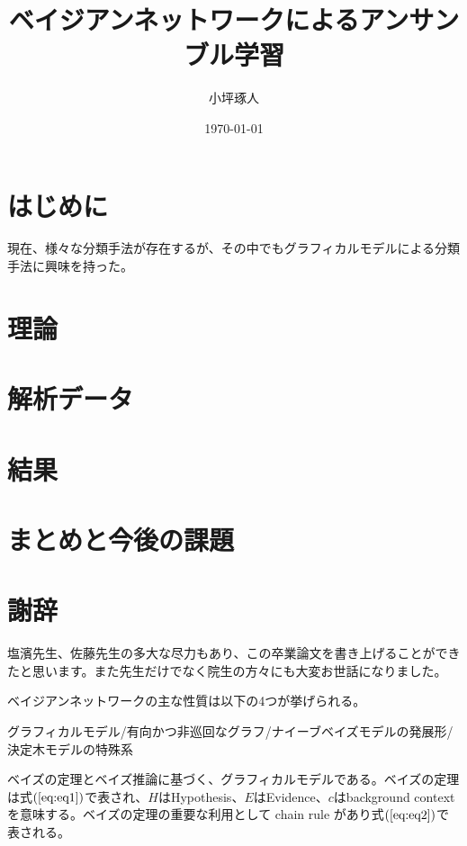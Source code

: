 \documentclass[a4j,12pt]{jarticle}
\title{ベイジアンネットワークによるアンサンブル学習}   %
\author{小坪琢人}   %
\date{\today}   %
\begin{document}
\maketitle   %
\setlength{\baselineskip}{20pt}   %
\tableofcontents   %
\listoffigures   %
\listoftables   %
\clearpage   %


\section{はじめに}

現在、様々な分類手法が存在するが、その中でもグラフィカルモデルによる分類手法に興味を持った。

\section{理論}



\section{解析データ}

\section{結果}

\section{まとめと今後の課題}

\section{謝辞}

塩濱先生、佐藤先生の多大な尽力もあり、この卒業論文を書き上げることができたと思います。また先生だけでなく院生の方々にも大変お世話になりました。


ベイジアンネットワークの主な性質は以下の4つが挙げられる。

グラフィカルモデル/有向かつ非巡回なグラフ/ナイーブベイズモデルの発展形/決定木モデルの特殊系

ベイズの定理とベイズ推論に基づく、グラフィカルモデルである。ベイズの定理は式$(\ref{eq:eq1})$で表され、$H$はHypothesis、$E$はEvidence、$c$はbackground contextを意味する。ベイズの定理の重要な利用として chain rule があり式$(\ref{eq:eq2})$で表される。
\end{document}
